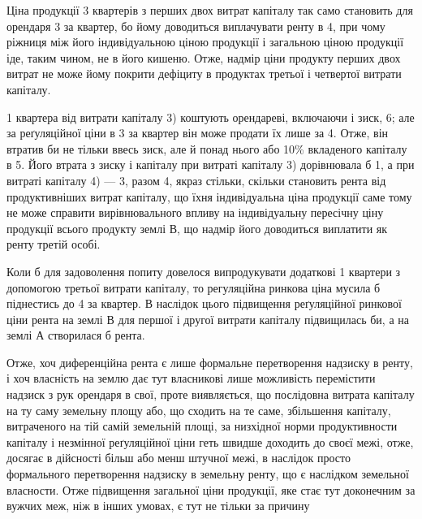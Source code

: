 
Ціна продукції 3 квартерів з перших двох витрат капіталу так само
становить для орендаря 3 за квартер, бо йому доводиться виплачувати
ренту в 4, при чому ріжниця між його індивідуальною ціною продукції
і загальною ціною продукції іде, таким чином, не в його кишеню. Отже,
надмір ціни продукту перших двох витрат не може йому покрити дефіциту
в продуктах третьої і четвертої витрати капіталу.

1 квартера від витрати капіталу 3) коштують орендареві, включаючи
і зиск, 6; але за реґуляційної ціни в 3 за квартер він може
продати їх лише за 4. Отже, він втратив би не тільки ввесь
зиск, але й понад нього  або  10\% вкладеного капіталу в 5.
Його втрата з зиску і капіталу при витраті капіталу 3) дорівнювала б  1, а при витраті капіталу 4) — 3, разом 4, якраз
стільки, скільки становить рента від продуктивніших витрат капіталу, що їхня
індивідуальна ціна продукції саме тому не може справити вирівнювального
впливу на індивідуальну пересічну ціну продукції всього продукту землі В, що
надмір його доводиться виплатити як ренту третій особі.

Коли б для задоволення попиту довелося випродукувати додаткові 1
квартери з допомогою третьої витрати капіталу, то регуляційна ринкова ціна
мусила б піднестись до 4 за квартер. В наслідок цього підвищення
реґуляційної ринкової ціни рента на землі В для першої і другої витрати капіталу
підвищилась би, а на землі А створилася б рента.

Отже, хоч диференційна рента є лише формальне перетворення надзиску
в ренту, і хоч власність на землю дає тут власникові лише можливість перемістити
надзиск з рук орендаря в свої, проте виявляється, що послідовна витрата
капіталу на ту саму земельну площу або, що сходить на те саме, збільшення
капіталу, витраченого на тій самій земельній площі, за низхідної норми
продуктивности капіталу і незмінної реґуляційної ціни геть швидше доходить
до своєї межі, отже, досягає в дійсності більш або менш штучної межі, в наслідок
просто формального перетворення надзиску в земельну ренту, що є наслідком
земельної власности. Отже підвищення загальної ціни продукції, яке стає
тут доконечним за вужчих меж, ніж в інших умовах, є тут не тільки за причину
\parbreak{}  %
